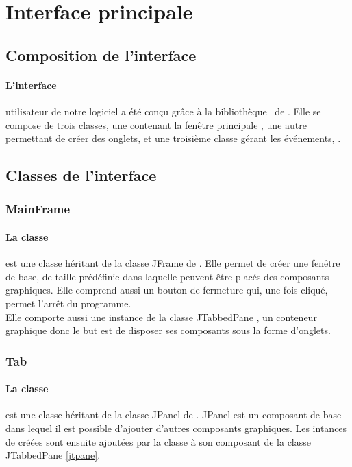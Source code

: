 \clearpage

\section{Interface principale}\label{sec:menu}

\subsection{Composition de l'interface}

\paragraph{L'interface}
utilisateur de notre logiciel a été conçu grâce à la bibliothèque \Swing \ de \Java. Elle se compose de trois classes, une contenant la fenêtre principale , une autre permettant de créer des onglets,  et une troisième classe gérant les événements, .

\subsection{Classes de l'interface}

\subsubsection{MainFrame}

\paragraph{La classe } est une classe héritant de la classe JFrame de \Swing. Elle permet de créer une fenêtre de base, de taille prédéfinie dans laquelle peuvent être placés des composants graphiques. Elle comprend aussi un bouton de fermeture qui, une fois cliqué, permet l'arrêt du programme.\\
Elle comporte aussi une instance de la classe JTabbedPane \label{jtpane}, un conteneur graphique donc le but est de disposer ses composants sous la forme d'onglets.

\subsubsection{Tab}

\paragraph{La classe } est une classe héritant de la classe JPanel de \Swing. JPanel est un composant de base dans lequel il est possible d'ajouter d'autres composants graphiques. Les intances de  créées sont ensuite ajoutées par la classe  à son composant de la classe JTabbedPane \ref{jtpane}.

